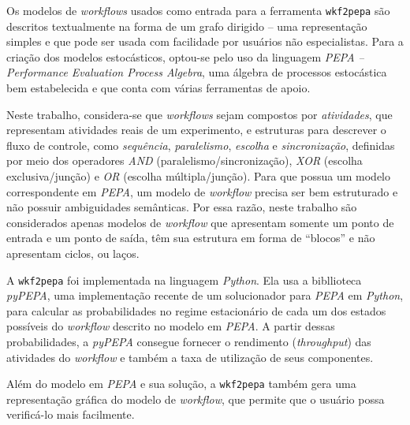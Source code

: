 \documentclass[a4paper,10pt]{article}
\begin{document}
        Os modelos de \emph{workflows} usados como entrada para a ferramenta \texttt{wkf2pepa} são descritos textualmente na forma de um grafo dirigido -- uma representação simples e que pode ser usada com facilidade por usuários não especialistas.
        Para a criação dos modelos estocásticos, optou-se pelo uso da linguagem \emph{PEPA -- Performance Evaluation Process Algebra}, uma álgebra de processos estocástica bem estabelecida e que conta com várias ferramentas de apoio.

         Neste trabalho, considera-se que \emph{workflows} sejam compostos por \emph{atividades}, que representam atividades reais de um experimento, e estruturas para descrever o fluxo de controle, como \emph{sequência}, \emph{paralelismo}, \emph{escolha} e \emph{sincronização}, definidas por meio dos operadores \emph{AND} (paralelismo/sincronização), \emph{XOR} (escolha exclusiva/junção) e \emph{OR} (escolha múltipla/junção).
        Para que possua um modelo correspondente em \emph{PEPA}, um modelo de \emph{workflow} precisa ser bem estruturado e não possuir ambiguidades semânticas. Por essa razão, neste trabalho são considerados apenas modelos de \emph{workflow} que apresentam somente um ponto de entrada e um ponto de saída, têm sua estrutura em forma de ``blocos'' e não apresentam ciclos, ou laços.

        A \texttt{wkf2pepa} foi implementada na linguagem \emph{Python}. Ela usa a bibllioteca \emph{pyPEPA}\cite{web:pypepa}, uma implementação recente de um solucionador para \emph{PEPA} em \emph{Python}, para calcular as probabilidades no regime estacion\'ario de cada um dos estados poss\'iveis do \emph{workflow} descrito no modelo em \emph{PEPA}. A partir dessas probabilidades, a \emph{pyPEPA} consegue fornecer o rendimento (\emph{throughput}) das atividades do \emph{workflow} e também a taxa de utilizaç\~ao de seus componentes.

        Além do modelo em \emph{PEPA} e sua solução, a \texttt{wkf2pepa} também gera uma representação gráfica do modelo de \emph{workflow}, que permite que o usuário possa verificá-lo mais facilmente.
\end{document}
